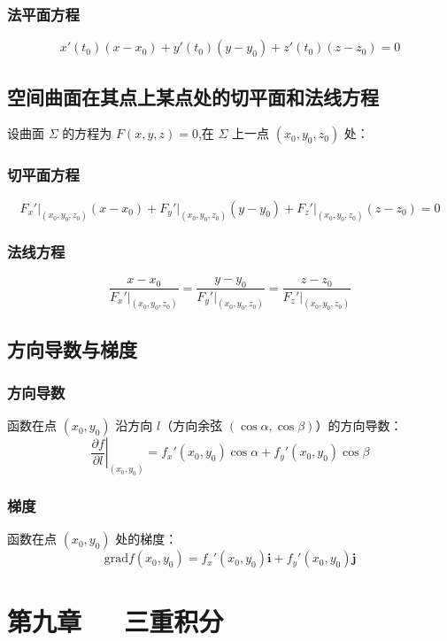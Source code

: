 \documentclass[UTF8]{ctexart}
\theoremstyle{remark}
\begin{document}
			\subsubsection*{法平面方程}  
			\[ x'(t_0)(x - x_0) + y'(t_0)(y - y_0) + z'(t_0)(z - z_0) = 0 \]  
			
			
			\subsection{空间曲面在其点上某点处的切平面和法线方程}
			设曲面 \( \Sigma \) 的方程为 \( F(x, y, z) = 0 \),在 \( \Sigma \) 上一点 \( (x_0, y_0, z_0) \) 处：  
			
			\subsubsection*{切平面方程}  
			\[ F_x'\big|_{(x_0,y_0,z_0)} (x - x_0) + F_y'\big|_{(x_0,y_0,z_0)} (y - y_0) + F_z'\big|_{(x_0,y_0,z_0)} (z - z_0) = 0 \]  
			
			\subsubsection*{法线方程}  
			\[ \frac{x - x_0}{F_x'\big|_{(x_0,y_0,z_0)}} = \frac{y - y_0}{F_y'\big|_{(x_0,y_0,z_0)}} = \frac{z - z_0}{F_z'\big|_{(x_0,y_0,z_0)}} \]  
			
			
			\subsection{方向导数与梯度}
			\subsubsection*{方向导数}
			函数在点 \( (x_0, y_0) \) 沿方向 \( l \)（方向余弦 \( (\cos\alpha, \cos\beta) \)）的方向导数：  
			\[ \left. \frac{\partial f}{\partial l} \right|_{(x_0,y_0)} = f_x'(x_0, y_0) \cos\alpha + f_y'(x_0, y_0) \cos\beta \]  
			
			
			\subsubsection*{梯度}
			函数在点 \( (x_0, y_0) \) 处的梯度：  
			\[ \text{grad}f(x_0, y_0) = f_x'(x_0, y_0) \boldsymbol{i} + f_y'(x_0, y_0) \boldsymbol{j} \]  
			
			\section{第九章~~~三重积分}
			
\end{document}
